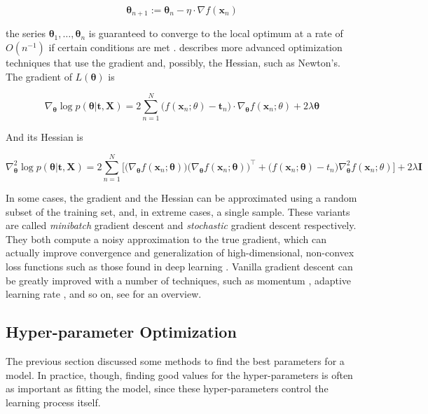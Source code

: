 \documentclass[12pt]{book}
\begin{document}
\begin{equation}
\bm\theta_{n+1}:=\bm\theta_n-\eta\cdot\nabla f(\bm x_n)
\end{equation}

the series $\bm\theta_1,\ldots,\bm\theta_n$ is guaranteed to converge to the local optimum at a rate of $O(n^{-1})$ if certain conditions are met \citep{gd_convergence}. \cite{numopt} describes more advanced optimization techniques that use the gradient and, possibly, the Hessian, such as Newton's. The gradient of $L(\bm\theta)$ is

\begin{equation}
\label{eq:least_squares_gradient}
\nabla_{\bm\theta}\log p(\bm\theta\vert\bm t,\bm X)
=2\sum_{n=1}^N \big(f(\bm x_n;\theta)-\bm t_n\big)\cdot\nabla_{\bm\theta}f(\bm x_n;\theta) + 2\lambda\bm\theta
\end{equation}

And its Hessian is

\begin{equation}
\label{eq:least_squares_hessian}
\nabla^2_{\bm\theta}\log p(\bm\theta\vert\bm t,\bm X)=2\sum_{n=1}^{N}\bigg[
\big(\nabla_{\bm\theta} f(\bm x_n;\bm\theta)\big)
\big(\nabla_{\bm\theta} f(\bm x_n;\bm\theta)\big)^\intercal
+\big(f(\bm x_n;\bm\theta)-t_n\big)\nabla^2_{\bm\theta}f(\bm x_n;\theta)\bigg]+2\lambda\bm I
\end{equation}

In some cases, the gradient and the Hessian can be approximated using a random subset of the training set, and, in extreme cases, a single sample. These variants are called \emph{minibatch} gradient descent and \emph{stochastic} gradient descent respectively. They both compute a noisy approximation to the true gradient, which can actually improve convergence and generalization of high-dimensional, non-convex loss functions such as those found in deep learning \citep{sgd_noise, bayesian_sgd}. Vanilla gradient descent can be greatly improved with a number of techniques, such as momentum \citep{gd_momentum}, adaptive learning rate \citep{adagrad, adadelta, adam}, and so on, see \cite{gd_overview} for an overview. 

\subsection{Hyper-parameter Optimization}
The previous section discussed some methods to find the best parameters for a model. In practice, though, finding good values for the hyper-parameters is often as important as fitting the model, since these hyper-parameters control the learning process itself.
\end{document}
